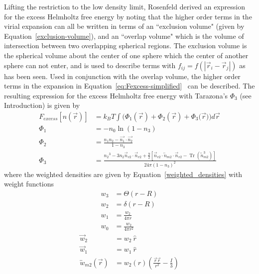 \documentclass[double,12pt]{beavtex}
\begin{document}
Lifting the restriction to the low density limit, Rosenfeld derived an
expression for the excess Helmholtz free energy by noting that the higher
order terms in the virial expansion can all be written in terms of an 
``exclusion volume" (given by Equation~\ref{exclusion-volume}), 
and an ``overlap volume" which is the volume of intersection between two 
overlapping spherical regions.
The exclusion volume is the spherical volume about the center of one sphere 
which the center of another sphere can not enter, and is used to describe
terms with $f_{ij}=f(|\vec r_i - \vec r_j|)$ as has been seen. Used in conjunction 
with the overlap volume, the higher order terms in the expansion
in Equation~\ref{eq:Fexcess-simplified}~\cite{rosenfeld1988} can be described. 
%
The resulting expression for the excess Helmholtz free energy with Tarazona's $\Phi_3$
(see Introduction) is given by
\begin{align}
    F_{excess}[n(\vec{r})] &= k_BT\int(\Phi_1(\vec{r})+\Phi_2(\vec{r})+\Phi_3(\vec{r}{)) d}\vec{r} \\
    \Phi_1 &= -n_{0}\ln(1-n_{3}) \\
    \Phi_2 &= \frac{n_{1}n_{2}-\vec{n_{1}}\cdot\vec{n_{2}}}{1-n_{3}} \\
    \Phi_3 &= \frac{{n_2}^3-3n_2\vec{n}_{v2}\cdot\vec{n}_{v2}+\frac{9}{2}[\vec{n}_{v2}\cdot{\overleftrightarrow{n}_{m2}}\cdot{\vec{n}_{v2}}-\operatorname{Tr}({\overleftrightarrow{n}^3_{m2}})]}{24\pi(1-n_3)^2}  
\end{align}
where the weighted densities are given by Equation~\ref{weighted_densities} with 
weight functions
\begin{align} 
      w_3 &= \Theta(r-R)  \label{scalar-weight3} \\
      w_2 &= \delta(r-R)  \\
      w_1 &= \frac{w_2}{4\pi r}  \\
      w_0 &= \frac{w_2}{4\pi r^2} \label{scalar-weight0}  
\end{align}
\begin{align}      
      \vec {w}_2 &= w_2~\hat r \\
      \vec {w}_1 &= w_1~\hat r \\
      \overleftrightarrow{w}_{m2}(\vec{r}) &= w_2(r)\left(\frac{\vec{r}\vec{r}}{r^2}-\frac{I}{3}\right) 
\end{align}
\end{document}
